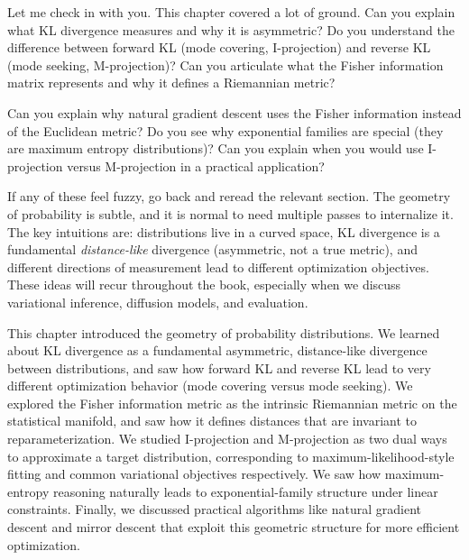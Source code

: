 \vspace{2em}


\begin{pausebox}
Let me check in with you. This chapter covered a lot of ground. Can you explain what KL divergence measures and why it is asymmetric? Do you understand the difference between forward KL (mode covering, I-projection) and reverse KL (mode seeking, M-projection)? Can you articulate what the Fisher information matrix represents and why it defines a Riemannian metric?

\vspace{0.5em}

Can you explain why natural gradient descent uses the Fisher information instead of the Euclidean metric? Do you see why exponential families are special (they are maximum entropy distributions)? Can you explain when you would use I-projection versus M-projection in a practical application?

\vspace{0.5em}

If any of these feel fuzzy, go back and reread the relevant section. The geometry of probability is subtle, and it is normal to need multiple passes to internalize it. The key intuitions are: distributions live in a curved space, KL divergence is a fundamental \emph{distance-like} divergence (asymmetric, not a true metric), and different directions of measurement lead to different optimization objectives. These ideas will recur throughout the book, especially when we discuss variational inference, diffusion models, and evaluation.
\end{pausebox}

\vspace{1em}

This chapter introduced the geometry of probability distributions. We learned about KL divergence as a fundamental asymmetric, distance-like divergence between distributions, and saw how forward KL and reverse KL lead to very different optimization behavior (mode covering versus mode seeking). We explored the Fisher information metric as the intrinsic Riemannian metric on the statistical manifold, and saw how it defines distances that are invariant to reparameterization. We studied I-projection and M-projection as two dual ways to approximate a target distribution, corresponding to maximum-likelihood-style fitting and common variational objectives respectively. We saw how maximum-entropy reasoning naturally leads to exponential-family structure under linear constraints. Finally, we discussed practical algorithms like natural gradient descent and mirror descent that exploit this geometric structure for more efficient optimization.

